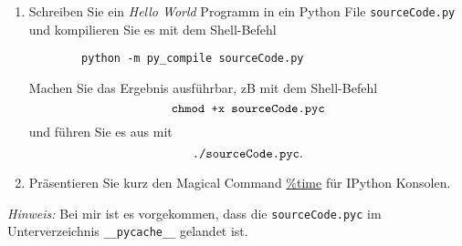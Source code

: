 \begin{enumerate}
	\item Schreiben Sie ein \textit{Hello World} Programm in ein Python File \verb|sourceCode.py| und kompilieren Sie es mit dem Shell-Befehl
	\begin{verbatim}
		python -m py_compile sourceCode.py
	\end{verbatim}
	Machen Sie das Ergebnis ausführbar, zB mit dem Shell-Befehl $$\verb|chmod +x sourceCode.pyc|$$ und führen Sie es aus mit $$\verb|./sourceCode.pyc|.$$
	\item Präsentieren Sie kurz den Magical Command \href{https://ipython.readthedocs.io/en/stable/interactive/magics.html}{\%time} für IPython Konsolen.
	
\end{enumerate}
\textit{Hinweis: } Bei mir ist es vorgekommen, dass die \verb|sourceCode.pyc| im Unterverzeichnis \verb|__pycache__| gelandet ist.
